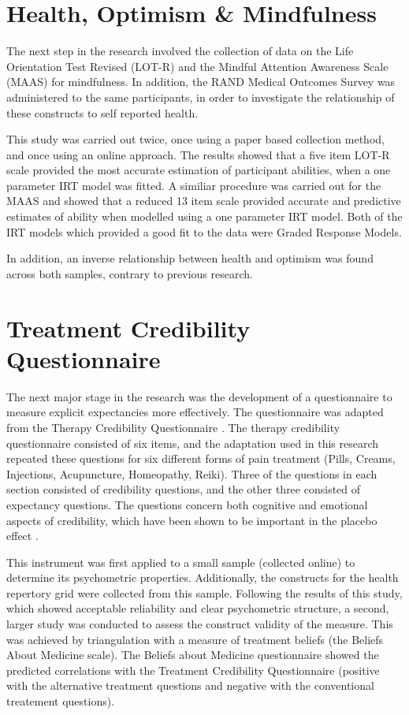 \documentclass{article}
\begin{document}
\section{Health, Optimism \& Mindfulness}
\label{sec:health-optimism-}

The next step in the research involved the collection of data on the Life Orientation Test Revised (LOT-R) and the Mindful Attention Awareness Scale (MAAS) for mindfulness. In addition, the RAND Medical Outcomes Survey was administered to the same participants, in order to investigate the relationship of these constructs to self reported health. 

This study was carried out twice, once using a paper based collection method, and once using an online approach. The results showed that a five item LOT-R scale provided the most accurate estimation of participant abilities, when a one parameter IRT model was fitted. A similiar procedure was carried out for the MAAS and showed that a reduced 13 item scale provided accurate and predictive estimates of ability when modelled using a one parameter IRT model. Both of the IRT models which provided a good fit to the data were Graded Response Models. 

In addition, an inverse relationship between health and optimism was found across both samples, contrary to previous research. 

\section{Treatment Credibility Questionnaire}
\label{sec:treatm-cred-quest}

The next major stage in the research was the development of a questionnaire to measure explicit expectancies more effectively. The questionnaire was adapted from the Therapy Credibility Questionnaire \cite{Devilly2000}. The therapy credibility questionnaire consisted of six items, and the adaptation used in this research repeated these questions for six different forms of pain treatment (Pills, Creams, Injections, Acupuncture, Homeopathy, Reiki). Three of the questions in each section consisted of credibility questions, and the other three consisted of expectancy questions. The questions concern both cognitive and emotional aspects of credibility, which have been shown to be important in the placebo effect  \cite{Blasi2001}. 

This instrument was first applied to a small sample (collected online) to determine its psychometric properties. Additionally, the constructs for the health repertory grid were collected from this sample.  Following the results of this study, which showed acceptable reliability and clear psychometric structure, a second, larger study was conducted to assess the construct validity of the measure. This was achieved by triangulation with a measure of treatment beliefs (the Beliefs About Medicine scale). The Beliefs about Medicine questionnaire showed the predicted correlations with the Treatment Credibility Questionnaire (positive with the alternative treatment questions and negative with the conventional treatement questions). 
\end{document}
